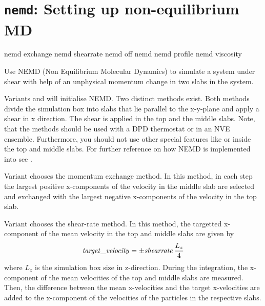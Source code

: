 \section{\texttt{nemd}: Setting up non-equilibrium MD}
\label{sec:NEMD}

\begin{essyntax}
  nemd exchange  
  nemd shearrate  
  nemd off
  nemd
  nemd profile
  nemd viscosity
  \begin{features}
  \end{features}
\end{essyntax}

Use NEMD (Non Equilibrium Molecular Dynamics) to simulate a system
under shear with help of an unphysical momentum change in two slabs in
the system.

Variants  and  will initialise NEMD. Two
distinct methods exist.  Both methods divide the simulation box into
 slabs that lie parallel to the x-y-plane and apply a
shear in x direction.  The shear is applied in the top and the middle
slabs. Note, that the methods should be used with a DPD thermostat or
in an NVE ensemble.  Furthermore, you should not use other special
features like  or  inside the
top and middle slabs. For further reference on how NEMD is implemented
into \es see \cite{soddeman01a}.


Variant  chooses the momentum exchange method.  In this
method, in each step the  largest positive
x-components of the velocity in the middle slab are selected and
exchanged with the  largest negative x-components of
the velocity in the top slab. 

Variant  chooses the shear-rate method. In this method, the
targetted x-component of the mean velocity in the top and middle slabs
are given by 
\begin{equation}
  \var{target\_velocity} = \pm \var{shearrate}\,\frac{L_z}{4}
\end{equation}
where $L_z$ is the simulation box size in z-direction. During the
integration, the x-component of the mean velocities of the top and
middle slabs are measured.  Then, the difference between the mean
x-velocities and the target x-velocities are added to the x-component
of the velocities of the particles in the respective slabs. 

